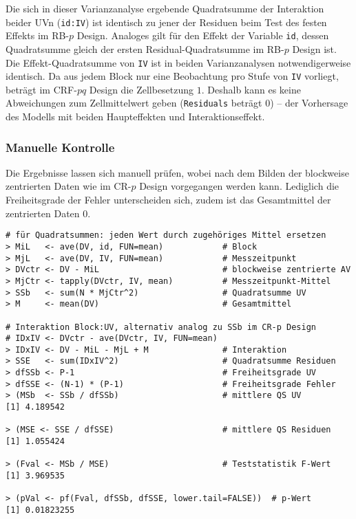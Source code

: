 Die sich in dieser Varianzanalyse ergebende Quadratsumme der Interaktion beider UVn (\lstinline!id:IV!) ist identisch zu jener der Residuen beim Test des festen Effekts im RB-$p$ Design. Analoges gilt für den Effekt der Variable \lstinline!id!, dessen Quadratsumme gleich der ersten Residual-Quadratsumme im RB-$p$ Design ist. Die Effekt-Quadratsumme von \lstinline!IV! ist in beiden Varianzanalysen notwendigerweise identisch. Da aus jedem Block nur eine Beobachtung pro Stufe von \lstinline!IV! vorliegt, beträgt im CRF-$pq$ Design die Zellbesetzung $1$. Deshalb kann es keine Abweichungen zum Zellmittelwert geben (\lstinline!Residuals! beträgt $0$) -- der Vorhersage des Modells mit beiden Haupteffekten und Interaktionseffekt.

\subsubsection{Manuelle Kontrolle}

Die Ergebnisse lassen sich manuell prüfen, wobei nach dem Bilden der blockweise zentrierten Daten wie im CR-$p$ Design vorgegangen werden kann. Lediglich die Freiheitsgrade der Fehler unterscheiden sich, zudem ist das Gesamtmittel der zentrierten Daten $0$.
\begin{lstlisting}
# für Quadratsummen: jeden Wert durch zugehöriges Mittel ersetzen
> MiL   <- ave(DV, id, FUN=mean)            # Block
> MjL   <- ave(DV, IV, FUN=mean)            # Messzeitpunkt
> DVctr <- DV - MiL                         # blockweise zentrierte AV
> MjCtr <- tapply(DVctr, IV, mean)          # Messzeitpunkt-Mittel
> SSb   <- sum(N * MjCtr^2)                 # Quadratsumme UV
> M     <- mean(DV)                         # Gesamtmittel

# Interaktion Block:UV, alternativ analog zu SSb im CR-p Design
# IDxIV <- DVctr - ave(DVctr, IV, FUN=mean)
> IDxIV <- DV - MiL - MjL + M               # Interaktion
> SSE   <- sum(IDxIV^2)                     # Quadratsumme Residuen
> dfSSb <- P-1                              # Freiheitsgrade UV
> dfSSE <- (N-1) * (P-1)                    # Freiheitsgrade Fehler
> (MSb  <- SSb / dfSSb)                     # mittlere QS UV
[1] 4.189542

> (MSE <- SSE / dfSSE)                      # mittlere QS Residuen
[1] 1.055424

> (Fval <- MSb / MSE)                       # Teststatistik F-Wert
[1] 3.969535

> (pVal <- pf(Fval, dfSSb, dfSSE, lower.tail=FALSE))  # p-Wert
[1] 0.01823255
\end{lstlisting}

